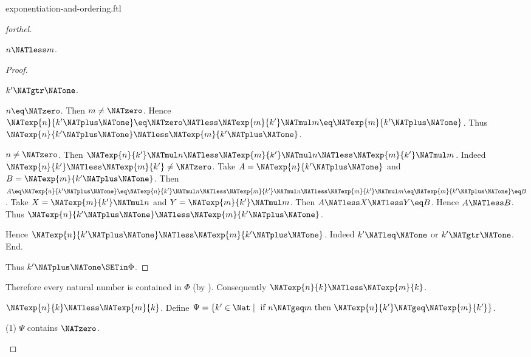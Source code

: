 \documentclass{naproche-library}
\begin{document}
\begin{smodule}[title=Exponentiation and Ordering]{exponentiation-and-ordering.ftl}
\begin{proof}[forthel]
\begin{case}{$n \NATless m$.}
\begin{proof}
        \begin{case}{$k' \NATgtr \NATone$.}
          \begin{case}{$n \eq \NATzero$.}
            Then $m \neq \NATzero$.
            Hence $\NATexp{n}{k' \NATplus \NATone}
              \eq \NATzero
              \NATless \NATexp{m}{k'} \NATmul m
              \eq \NATexp{m}{k' \NATplus \NATone}$.
            Thus $\NATexp{n}{k' \NATplus \NATone} \NATless \NATexp{m}{k' \NATplus \NATone}$.
          \end{case}

          \begin{case}{$n \neq \NATzero$.}
            Then $\NATexp{n}{k'} \NATmul n
              \NATless \NATexp{m}{k'} \NATmul n
              \NATless \NATexp{m}{k'} \NATmul m$.
            Indeed $\NATexp{n}{k'} \NATless \NATexp{m}{k'} \neq \NATzero$.
            Take $A = \NATexp{n}{k' \NATplus \NATone}$ and $B = \NATexp{m}{k' \NATplus \NATone}$. %
            Then $A
              \eq \NATexp{n}{k' \NATplus \NATone}
              \eq \NATexp{n}{k'} \NATmul n
              \NATless \NATexp{m}{k'} \NATmul n
              \NATless \NATexp{m}{k'} \NATmul m
              \eq \NATexp{m}{k' \NATplus \NATone}
              \eq B$.
            Take $X = \NATexp{m}{k'} \NATmul n$ and $Y = \NATexp{m}{k'} \NATmul m$.
            Then $A \NATless X \NATless Y \eq B$.
            Hence $A \NATless B$.
            Thus $\NATexp{n}{k' \NATplus \NATone} \NATless \NATexp{m}{k' \NATplus \NATone}$.
          \end{case}
        \end{case}

        Hence $\NATexp{n}{k' \NATplus \NATone} \NATless \NATexp{m}{k' \NATplus \NATone}$.
        Indeed $k' \NATleq \NATone$ or $k' \NATgtr \NATone$.
      End.

      Thus $k' \NATplus \NATone \SETin \Phi$.
    \end{proof}

    Therefore every natural number is contained in $\Phi$ (by ).
    Consequently $\NATexp{n}{k} \NATless \NATexp{m}{k}$.
  \end{case}

  \begin{case}{$\NATexp{n}{k} \NATless \NATexp{m}{k}$.}
    Define $\Psi = \{ k' \in \Nat \mid\text{ if }n \NATgeq m\text{ then }\NATexp{n}{k'} \NATgeq \NATexp{m}{k'} \}$.

    (1) $\Psi$ contains $\NATzero$.


\end{case}
\end{proof}
\end{smodule}
\end{document}
